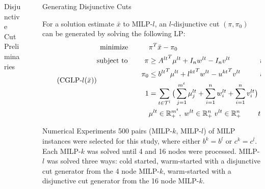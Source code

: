 \documentclass[final]{beamer}
\newlength{\sepwidth}
\newlength{\colwidth}
\newcommand{\separatorcolumn}{\begin{column}{\sepwidth}\end{column}}
\begin{document}
\begin{frame}[t]
\begin{columns}[t]
\begin{column}{\colwidth}
\begin{block}{Disjunctive Cut Preliminaries}
  \end{block}

\end{column}

\separatorcolumn

\begin{column}{\colwidth}

  \begin{block}{Generating Disjunctive Cuts}

    For a solution estimate $ \bar{x} $ to MILP-$ l $, an $ l $-disjunctive cut $ (\pi, \pi_0) $ can be generated by solving the following LP:
    \begin{equation} \tag{CGLP-$ l(\bar{x}) $}
    	\begin{alignedat}{2} \label{e:cglp_l_xbar} 
    		\text{minimize } \; \; \qquad & \pi^T \bar{x} - \pi_0 && \\
    		\text{subject to } \qquad \pi & \geq {A^{lt}}^T \mu^{lt} + I_n w^{lt} - I_n v^{lt} && \;  t \in \mathcal{T}^l \\
    		\pi_0 & \leq {b^{lt}}^T \mu^{lt} + {l^{kt}}^T w^{lt} - {u^{kt}}^T v^{lt} && \; t \in \mathcal{T}^l \\
    		1 & = \sum_{t \in \mathcal{T}^l} \big( \sum_{j=1}^{m^t} \mu_j^{lt} + \sum_{i=1}^{n} w_i^{lt} + \sum_{i=1}^{n} v_i^{lt} \big) && \\
    		& \mu^{lt} \in \Rmbb_+^{m^t}, \; w^{lt} \in \Rmbb_+^n \; v^{lt} \in \Rmbb_+^n && t \in \mathcal{T}^l
    	\end{alignedat}
    \end{equation} 
	
  \end{block}

  \begin{block}{Numerical Experiments}
  	500 pairs (MILP-$ k $, MILP-$ l $) of MILP instances were selected for this study, where either $ b^k = b^l $ or $ c^k = c^l $. Each MILP-$ k $ was solved until 4 and 16 nodes were processed. MILP-$ l $ was solved three ways: cold started, warm-started with a disjunctive cut generator from the 4 node MILP-$ k $, warm-started with a disjunctive cut generator from the 16 node MILP-$ k $.
  	

\end{block}
\end{column}
\end{columns}
\end{frame}
\end{document}
